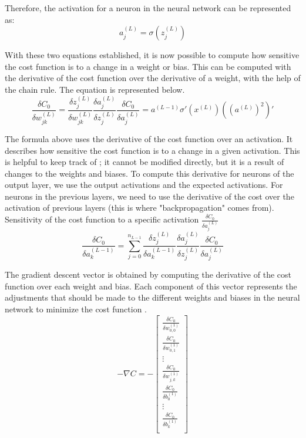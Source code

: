 \documentclass[12pt,a4paper,notitlepage]{article}
\begin{document}
Therefore, the activation for a neuron in the neural network can be represented as:
\begin{displaymath}
	a_j^{(L)} = \sigma\left(z_j^{(L)}\right)
\end{displaymath}

With these two equations established, it is now possible to compute how sensitive the cost function is to a change in a weight or bias. This can be computed with the derivative of the cost function over the derivative of a weight, with the help of the chain rule. The equation is represented below.
\begin{displaymath}
	\frac{\delta C_0}{\delta w_{jk}^{(L)}} =
	\frac{\delta z_j^{(L)}}{\delta w_{jk}^{(L)}}
	\frac{\delta a_j^{(L)}}{\delta z_j^{(L)}}
	\frac{\delta C_0}{\delta a_j^{(L)}}
	= a^{(L-1)} \sigma\prime(x^{(L)})((a^{(L)})^2)\prime
\end{displaymath}

The formula above uses the derivative of the cost function over an activation. It describes how sensitive the cost function is to a change in a given activation. This is helpful to keep track of ; it cannot be modified directly, but it is a result of changes to the weights and biases. To compute this derivative for neurons of the output layer, we use the output activations and the expected activations. For neurons in the previous layers, we need to use the derivative of the cost over the activation of previous layers (this is where "backpropagation" comes from).
Sensitivity of the cost function to a specific activation \(\frac{\delta C_0}{\delta a_j^{(L)}}\)
\begin{displaymath}
	\frac{\delta C_0}{\delta a_{k}^{(L-1)}} = 
	\sum_{j=0}^{n_{L-1}}
	\frac{\delta z_j^{(L)}}{\delta a_{k}^{(L-1)}}
	\frac{\delta a_j^{(L)}}{\delta z_j^{(L)}}
	\frac{\delta C_0}{\delta a_j^{(L)}}
\end{displaymath}

The gradient descent vector is obtained by computing the derivative of the cost function over each weight and bias. Each component of this vector represents the adjustments that should be made to the different weights and biases in the neural network to minimize the cost function \cite{sanderson_backpropagation_2017}.
\begin{displaymath}
	-\nabla C =
	-\begin{bmatrix}
		\frac{\delta C_0}{\delta w_{0,0}^{(1)}}\\
		\frac{\delta C_0}{\delta w_{0,1}^{(1)}}\\
		\vdots\\
		\frac{\delta C_0}{\delta w_{j,k}^{(1)}}\\
		\frac{\delta C_0}{\delta b_{0}^{(1)}}\\
		\vdots\\
		\frac{\delta C_0}{\delta b_{k}^{(1)}}\\
	\end{bmatrix}
\end{displaymath}
\end{document}

